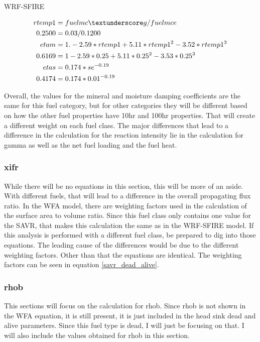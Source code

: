 \documentclass{article}
\begin{document}
WRF-SFIRE


\begin{equation}
	\begin{split}
		rtemp1 &= fuelmc\textunderscore g / fuelmce \\
		0.2500 &= 0.03 / 0.1200 \\
		etam & = 1.-2.59*rtemp1 +5.11*rtemp1^2 -3.52*rtemp1^3 \\
		0.6169 &= 1 - 2.59 * 0.25 + 5.11 * 0.25^2 - 3.53 * 0.25^3 \\
		etas &= 0.174 * se^{-0.19} \\
		0.4174 &= 0.174 * 0.01 ^ {-0.19}
	\end{split}
\end{equation}


Overall, the values for the mineral and moisture damping coefficients are the same for this fuel category, but for other categories they will be different based on how the other fuel properties have 10hr and 100hr properties. That will create a different weight on each fuel class. 
The major differences that lead to a difference in the calculation for the reaction intensity lie in the calculation for gamma as well as the net fuel loading and the fuel heat.



\subsubsection{xifr}

While there will be no equations in this section, this will be more of an aside. With different fuels, that will lead to a difference in the overall propagating flux ratio. In the WFA model, there are weighting factors used in the calculation of the surface area to volume ratio. Since this fuel class only contains one value for the SAVR, that makes this calculation the same as in the WRF-SFIRE model. If this analysis is performed with a different fuel class, be prepared to dig into those equations. The leading cause of the differences would be due to the different weighting factors. Other than that the equations are identical. The weighting factors can be seen in equation \ref{savr_dead_alive}. 


\subsubsection{rhob}

This sections will focus on the calculation for rhob. Since rhob is not shown in the WFA equation, it is still present, it is just included in the head sink dead and alive parameters. Since this fuel type is dead, I will just be focusing on that. I will also include the values obtained for rhob in this section. 
\end{document}
